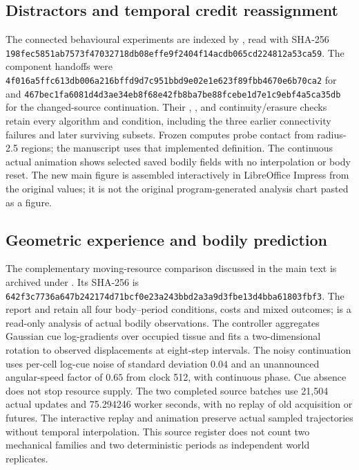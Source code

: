\subsection*{Distractors and temporal credit reassignment}
The connected behavioural experiments are indexed by , read with SHA-256 \texttt{198fec58\allowbreak{}51ab7573\allowbreak{}f4703271\allowbreak{}8db08eff\allowbreak{}e9f2404f\allowbreak{}14acdb06\allowbreak{}5cd22481\allowbreak{}2a53ca59}. The component handoffs were \texttt{4f016a5f\allowbreak{}fc613db0\allowbreak{}06a216bf\allowbreak{}fd9d7c95\allowbreak{}1bbd9e02\allowbreak{}e1e623f8\allowbreak{}9fbb4670\allowbreak{}e6b70ca2} for  and \texttt{467bec1f\allowbreak{}a6081d4d\allowbreak{}3ae34eb8\allowbreak{}f68e42fb\allowbreak{}8ba7be88\allowbreak{}fcebe1d7\allowbreak{}e1c9ebf4\allowbreak{}a5ca35db} for the changed-source continuation. Their , ,  and continuity/erasure checks retain every algorithm and condition, including the three earlier connectivity failures and later surviving subsets. Frozen  computes probe contact from radius-2.5 regions; the manuscript uses that implemented definition. The continuous actual animation shows selected saved bodily fields with no interpolation or body reset. The new main figure is assembled interactively in LibreOffice Impress from the original values; it is not the original program-generated analysis chart pasted as a figure.

\subsection*{Geometric experience and bodily prediction}
The complementary moving-resource comparison discussed in the main text is archived under . Its  SHA-256 is \texttt{642f3c77\allowbreak{}36a647b2\allowbreak{}42174d71\allowbreak{}bcf0e23a\allowbreak{}243bbd2a\allowbreak{}3a9d3fbe\allowbreak{}13d4bba6\allowbreak{}1803fbf3}. The report and  retain all four body--period conditions, costs and mixed outcomes;  is a read-only analysis of actual bodily observations. The controller aggregates Gaussian cue log-gradients over occupied tissue and fits a two-dimensional rotation to observed displacements at eight-step intervals. The noisy continuation uses per-cell log-cue noise of standard deviation $0.04$ and an unannounced angular-speed factor of $0.65$ from clock 512, with continuous phase. Cue absence does not stop resource supply. The two completed source batches use 21,504 actual updates and 75.294246 worker seconds, with no replay of old acquisition or futures. The interactive replay and animation preserve actual sampled trajectories without temporal interpolation. This source register does not count two mechanical families and two deterministic periods as independent world replicates.

